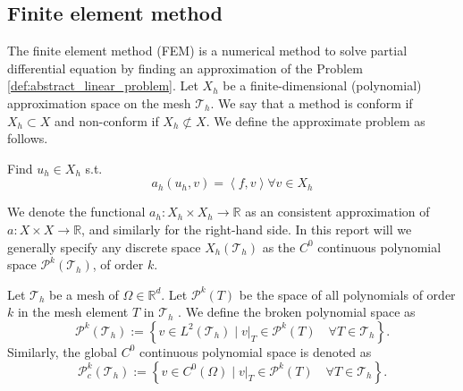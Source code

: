 \subsection{Finite element method}%
\label{sub:finite_element_method}


The finite element method (FEM) is a numerical method to solve partial differential equation by finding an approximation of the Problem \ref{def:abstract_linear_problem}.  Let $X_{h}$ be a finite-dimensional (polynomial) approximation space on the mesh
$\mathcal{T} _{h}$. We say that a method is conform if $X_{h}\subset X $ and non-conform if $X _{h} \not\subset X$. We define the approximate problem as follows.
\begin{problem}
    \label{def:approx_problem}
    Find  $u_{h} \in X_{h}$ s.t. \[
    a_{h}(u_{h},v ) = \left<f,v \right>   \forall v \in X_{h}
    \]
\end{problem}

We denote the functional $a_{h}: X_{h} \times X_{h} \to \mathbb{R} $ as an consistent approximation of $a: X \times X \to \mathbb{R} $, and similarly for the right-hand side.
In this report will we generally specify any discrete space $X_{h}(\mathcal{T}_{h})$  as the $C^{0}$ continuous polynomial space $\mathcal{P}^{k}(\mathcal{T}_{h})$, of order $k$.

\begin{definition}
    Let $\mathcal{T}_{h} $ be a mesh of $\Omega \in \mathbb{R} ^{d} $. Let $\mathcal{P}^{k}(T) $ be the space of all polynomials of order $k$ in the mesh element $T$ in $\mathcal{T}_{h}$ . We define the broken polynomial space as \[
    \mathcal{P}^{k} ( \mathcal{T}_{h} ) := \left\{ v \in L^{2}( \mathcal{T}_{h} )    \mid  v|_{T} \in \mathcal{P}^k( T) \quad  \forall T \in  \mathcal{T}_{h}   \right\}.
    \]
    Similarly, the global $C^{0}$ continuous polynomial space is denoted as
    \[
    \mathcal{P}^{k}_{c} ( \mathcal{T}_{h} ) := \left\{ v \in C^{0}( \Omega )   \mid  v|_{T} \in \mathcal{P}^k( T) \quad  \forall T \in  \mathcal{T}_{h}   \right\}.
    \]

\end{definition}


